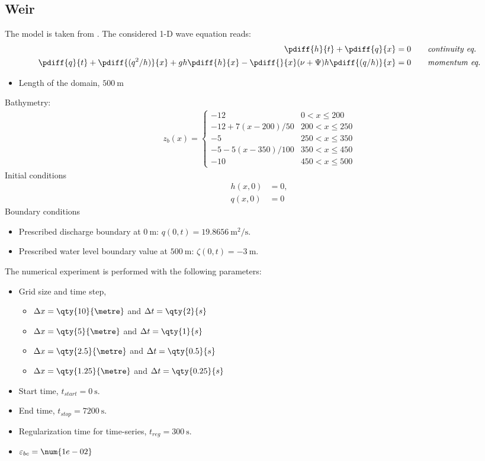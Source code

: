 \subsection{Weir}
The model is taken from \citet{Borsboom2001}.
The considered 1-D wave equation reads:
\begin{align}
    \pdiff{h}{t}  + \pdiff{q}{x} & = 0 \qquad \textit{continuity eq.} \\
    \pdiff{q}{t}  + \pdiff{(q^2/h)}{x} + g h \pdiff{h}{x} - \pdiff{}{x} (\nu+\Psi) h \pdiff{(q/h)}{x}  & = 0 \qquad \textit{momentum eq.}
\end{align}
\begin{itemize}
    \item Length of the domain, $\SI{500}{\metre}$
\end{itemize}
Bathymetry:
\begin{align}
    z_b(x) =
    \begin{cases}
        \num{-12} & 0 < x \leq 200
        \\
        \num{-12} + 7 (x - 200)/50 & 200 < x \leq 250
        \\
        \num{-5} & 250 < x \leq 350
        \\
        \num{-5} - 5(x - 350)/100 & 350 < x \leq 450
        \\
        \num{-10} & 450 < x \leq 500
    \end{cases}
\end{align}
Initial conditions
\begin{align}
    h(x,0) & = 0,\\
    q(x,0) & = 0
\end{align}
Boundary conditions
\begin{itemize}
    \item Prescribed discharge boundary at $\qty{0}{\metre}$: $q(0,t) = \qty{19.8656}{\square\metre\per\second}$.
    \item Prescribed water level boundary value at $\qty{500}{\metre}$: $\zeta(0,t) = \qty{-3}{\metre}$.
\end{itemize}
The numerical experiment is performed with the following parameters:
\begin{itemize}
    \item Grid size and time step,
    \begin{itemize}
        \item $\Dx = \qty{10}{\metre}$ and $\Dt = \qty{2}{s}$
        \item $\Dx = \qty{5}{\metre}$ and $\Dt = \qty{1}{s}$
        \item $\Dx = \qty{2.5}{\metre}$ and $\Dt = \qty{0.5}{s}$
        \item $\Dx = \qty{1.25}{\metre}$ and $\Dt = \qty{0.25}{s}$
    \end{itemize}
    \item Start time, $t_{start} = \qty{0}{\second}$.
    \item End time, $t_{stop} = \qty{7200}{\second}$.
    \item Regularization time for time-series, $t_{reg} = \qty{300}{\second}$.
    \item $\eps_{bc} = \num{1e-02}$
\end{itemize}
